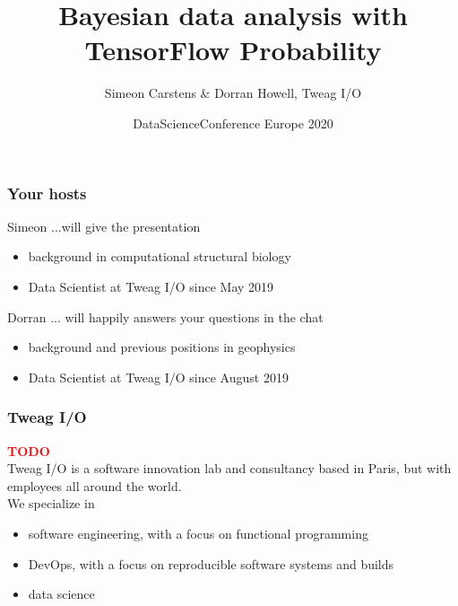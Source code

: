 \documentclass[t, aspectratio=169]{beamer}
\title{Bayesian data analysis with TensorFlow Probability}
\date{DataScienceConference Europe 2020}
\author{Simeon Carstens \& Dorran Howell, Tweag I/O}
\newcommand{\todo}{\textcolor{red}{\textbf{TODO}}}
\begin{document}
\begin{frame}
  \titlepage
\end{frame}


\begin{frame}
  \frametitle{Your hosts}
  \begin{block}{Simeon}
     ...will give the presentation \\
    \begin{itemize}
    \item background in computational structural biology
    \item Data Scientist at Tweag I/O since May 2019
    \end{itemize}
  \end{block}
  \begin{block}{Dorran}
     ... will happily answers your questions in the chat\\
    \begin{itemize}
    \item background and previous positions in geophysics
    \item Data Scientist at Tweag I/O since August 2019
    \end{itemize}
  \end{block}
\end{frame}


\begin{frame}
  \frametitle{Tweag I/O}
  \todo \\
  Tweag I/O is a software innovation lab and consultancy based in Paris, but with employees all around the world.\\
  We specialize in
  \begin{itemize}
  \item software engineering, with a focus on functional programming
  \item DevOps, with a focus on reproducible software systems and builds
  \item data science
  \end{itemize}
\end{frame}
\end{document}
